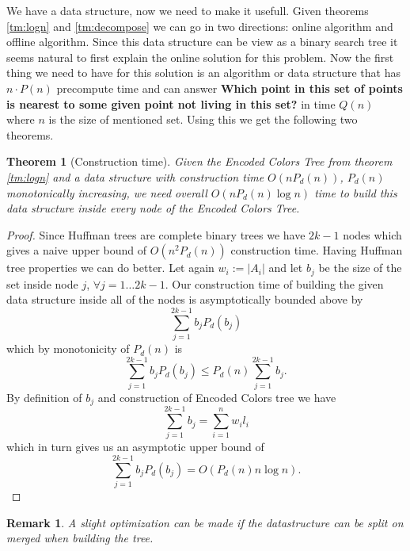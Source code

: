 \documentclass{article}
\newtheorem{theorem}{Theorem}
\newtheorem{remark}{Remark}
\newtheorem{proof}{Proof}
\begin{document}
We have a data structure, now we need to make it usefull.
Given theorems \ref{tm:logn} and \ref{tm:decompose} we can go in two directions: online algorithm and offline algorithm.
Since this data structure can be view as a binary search tree it seems natural to first explain the online solution for this problem.
Now the first thing we need to have for this solution is an algorithm or data structure that has $n \cdot P\left(n\right)$ precompute time and can answer {\bf Which point in this set of points is nearest to some given point not living in this set?} in time $Q(n)$ where $n$ is the size of mentioned set.
Using this we get the following two theorems.


\begin{theorem}[Construction time]\label{tm:construct}
Given the Encoded Colors Tree from theorem \ref{tm:logn} and a data structure with construction time $O\left(nP_d\left(n\right)\right)$, $P_d(n)$ monotonically increasing, we need overall $O\left(nP_d(n)\log n\right)$ time to build this data structure inside every node of the Encoded Colors Tree.
\end{theorem}
\begin{proof}
Since Huffman trees are complete binary trees we have $2k - 1$ nodes which gives a naive upper bound of $O\left(n^2P_d(n)\right)$ construction time.
Having Huffman tree properties we can do better.
Let again $w_i := |A_i|$ and let $b_j$ be the size of the set inside node $j$, $\forall j = 1\dots 2k-1$.
Our construction time of building the given data structure inside all of the nodes is asymptotically bounded above by
$$ \sum\limits_{j=1}^{2k - 1} b_jP_d(b_j) $$
which by monotonicity of $P_d(n)$ is
$$ \sum\limits_{j=1}^{2k - 1} b_jP_d(b_j) \leq
P_d(n) \sum\limits_{j=1}^{2k - 1} b_j. $$
By definition of $b_j$ and construction of Encoded Colors tree we have
$$ \sum\limits_{j = 1}^{2k - 1} b_j = \sum\limits_{i = 1}^n w_il_i $$
which in turn gives us an asymptotic upper bound of
$$ \sum\limits_{j = 1}^{2k - 1} b_jP_d(b_j) = O\left( P_d(n)n \log n\right). $$
\end{proof}

\begin{remark}
A slight optimization can be made if the datastructure can be split on merged when building the tree.
\end{remark}
\end{document}
